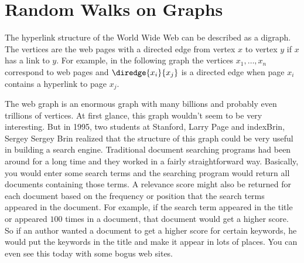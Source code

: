\begin{problems}
\classproblems
{}

\homeworkproblems
{}
\end{problems}


\section{Random Walks on Graphs}\label{Google_sec}

\begin{editingnotes}


\end{editingnotes}

The hyperlink structure of the World Wide Web can be described as a
digraph.  The vertices are the web pages with a directed edge from vertex
$x$ to vertex $y$ if $x$ has a link to $y$.  For example, in the following
graph the vertices $x_1, \ldots, x_n$ correspond to web pages and
$\diredge{x_i}{x_j}$ is a directed edge when page $x_i$ contains a
hyperlink to page $x_j$.


The web graph is an enormous graph with many billions and probably even
trillions of vertices.  At first glance, this graph wouldn't seem to be very
interesting.  But in 1995, two students at Stanford, 
Larry Page and index{Brin, Sergey} Sergey Brin realized that the structure
of this graph could be very useful in building a search engine.
Traditional document searching programs had been around for a long time
and they worked in a fairly straightforward way.  Basically, you would
enter some search terms and the searching program would return all
documents containing those terms.  A relevance score might also be
returned for each document based on the frequency or position that the
search terms appeared in the document.  For example, if the search term
appeared in the title or appeared $100$ times in a document, that document
would get a higher score.  So if an author wanted a document to get a
higher score for certain keywords, he would put the keywords in the title
and make it appear in lots of places.  You can even see this today with
some bogus web sites.

